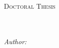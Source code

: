 \documentclass[
11pt, %
english, %
singlespacing, %
toctotoc, %
headsepline, %
]{MastersDoctoralThesis} %
\author{Qian \textsc{Zhang}} %
\begin{document}
\sloppy

\frontmatter %

\pagestyle{plain} %


\begin{titlepage}
\begin{center}

\vspace*{.06\textheight}
{\scshape\LARGE \univname\par}\vspace{1.5cm} %
\textsc{\Large Doctoral Thesis}\\[0.5cm] %

\HRule \\[0.4cm] %
{\huge \bfseries \ttitle\par}\vspace{0.4cm} %
\HRule \\[1.5cm] %
 
\emph{Author:}\\
\href{https://www.researchgate.net/profile/Miranda_Zhang3}{\authorname} %
 

\end{center}
\end{titlepage}
\end{document}
